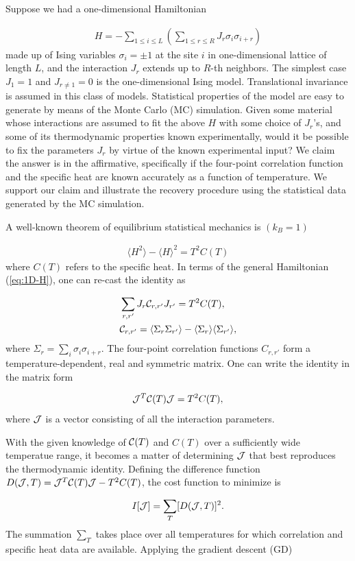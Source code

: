 \documentclass[reprint,amsmath,amssymb,aps,showpacs,superscriptaddress,prb]{revtex4-1}
\newcommand{\ba}{\begin{eqnarray}}
\newcommand{\ea}{\end{eqnarray}}
\newcommand{\nn}{\nonumber \\}
\begin{document}
Suppose we had a one-dimensional Hamiltonian

\ba H = - \sum_{1 \le i \le L} \left( \sum_{1 \le r \le R} J_{r} \sigma_i \sigma_{i+r} \right) \label{eq:1D-H} \ea
made up of Ising variables $\sigma_i = \pm 1$ at the site $i$ in one-dimensional lattice of length $L$, and the interaction $J_{r}$ extends up to $R$-th neighbors. The simplest case $J_1 = 1$ and $J_{r \neq 1} =0$ is the one-dimensional Ising model. Translational invariance is assumed in this class of models. Statistical properties of the model are easy to generate by means of the Monte Carlo (MC) simulation. Given some material whose interactions are assumed to fit the above $H$ with some choice of $J_r$'s, and some of its thermodynamic properties known experimentally, would it be possible to fix the parameters $J_r$ by virtue of the known experimental input? We claim the answer is in the affirmative, specifically if the four-point correlation function and the specific heat are known accurately as a function of temperature. We support our claim and illustrate the recovery procedure using the statistical data generated by the MC simulation.

A well-known theorem of equilibrium statistical mechanics is $(k_B = 1)$

\ba \langle H^2 \rangle - \langle H \rangle^2 = T^2 C(T) \ea
where $C(T)$ refers to the specific heat. In terms of the general Hamiltonian (\ref{eq:1D-H}), one can re-cast the identity as

\ba & \sum_{r,r'} J_r {\cal C}_{r,r'} J_{r'} = T^2 C(T), \nn
%
& {\cal C}_{r,r'} = \langle \Sigma_r \Sigma_{r'} \rangle -  \langle \Sigma_r \rangle \langle \Sigma_{r'} \rangle, \ea
where $\Sigma_r = \sum_i \sigma_i \sigma_{i+r}$. The four-point correlation functions $C_{r,r'}$ form a temperature-dependent, real and symmetric matrix. One can write the identity in the matrix form

\ba {\cal J}^T {\cal C}(T) {\cal J} = T^2 C(T) , \ea
%
where ${\cal J}$ is a vector consisting of all the interaction parameters.

With the given knowledge of ${\cal C}(T)$ and $C(T)$ over a sufficiently wide temperatue range, it becomes a matter of determining ${\cal J}$ that best reproduces the thermodynamic identity. Defining the difference function $D({\cal J}, T) = {\cal J}^T {\cal C}(T) {\cal J} - T^2 C(T)$, the cost function to minimize is

\ba I[{\cal J}] = \sum_T [D({\cal J}, T)]^2 . \ea
The summation $\sum_T$ takes place over all temperatures for which correlation and specific heat data are available. Applying the gradient descent (GD)
\end{document}

